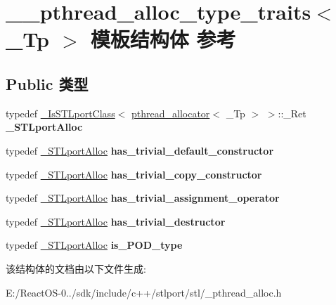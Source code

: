 \hypertarget{struct____pthread__alloc__type__traits}{}\section{\+\_\+\+\_\+pthread\+\_\+alloc\+\_\+type\+\_\+traits$<$ \+\_\+\+Tp $>$ 模板结构体 参考}
\label{struct____pthread__alloc__type__traits}
\subsection*{Public 类型}
\begin{DoxyCompactItemize}
\item 
\mbox{\label{struct____pthread__alloc__type__traits_a2fe82142a9069dcb404f5e0ee6c94ad6}} 
typedef \hyperlink{struct___is_s_t_lport_class}{\+\_\+\+Is\+S\+T\+Lport\+Class}$<$ \hyperlink{classpthread__allocator}{pthread\+\_\+allocator}$<$ \+\_\+\+Tp $>$ $>$\+::\+\_\+\+Ret {\bfseries \+\_\+\+S\+T\+Lport\+Alloc}
\item 
\mbox{\label{struct____pthread__alloc__type__traits_aa64332c928371eb7d47f8e3ef11d0aad}} 
typedef \hyperlink{struct____true__type}{\+\_\+\+S\+T\+Lport\+Alloc} {\bfseries has\+\_\+trivial\+\_\+default\+\_\+constructor}
\item 
\mbox{\label{struct____pthread__alloc__type__traits_aca1eb5e142d4cd314c9716daff6a618a}} 
typedef \hyperlink{struct____true__type}{\+\_\+\+S\+T\+Lport\+Alloc} {\bfseries has\+\_\+trivial\+\_\+copy\+\_\+constructor}
\item 
\mbox{\label{struct____pthread__alloc__type__traits_ada568b0a37a39b0d436d94536e780b24}} 
typedef \hyperlink{struct____true__type}{\+\_\+\+S\+T\+Lport\+Alloc} {\bfseries has\+\_\+trivial\+\_\+assignment\+\_\+operator}
\item 
\mbox{\label{struct____pthread__alloc__type__traits_aebbee26e6badfaf710cdc443171d37ac}} 
typedef \hyperlink{struct____true__type}{\+\_\+\+S\+T\+Lport\+Alloc} {\bfseries has\+\_\+trivial\+\_\+destructor}
\item 
\mbox{\label{struct____pthread__alloc__type__traits_ae5d482e0ce2f8175bf65c40fb7a5a7d3}} 
typedef \hyperlink{struct____true__type}{\+\_\+\+S\+T\+Lport\+Alloc} {\bfseries is\+\_\+\+P\+O\+D\+\_\+type}
\end{DoxyCompactItemize}


该结构体的文档由以下文件生成\+:\begin{DoxyCompactItemize}
\item 
E\+:/\+React\+O\+S-\/0../sdk/include/c++/stlport/stl/\+\_\+pthread\+\_\+alloc.\+h\end{DoxyCompactItemize}
